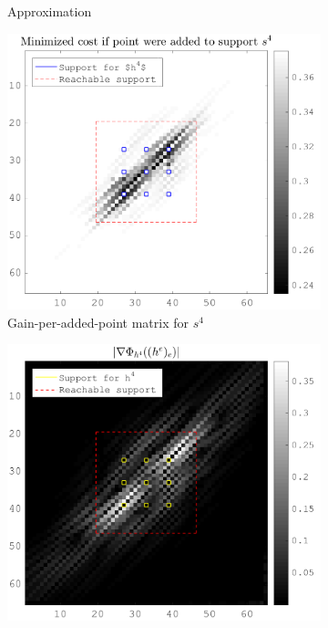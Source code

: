 \begin{figure}[!h]
\begin{subfigure}[b]{0.49\textwidth}
\caption{Approximation} \label{fig_gain_vs_grad_approx}
\end{subfigure}
\begin{subfigure}[b]{0.49\textwidth}\centering
\includegraphics[width=\textwidth]{figures/xp/xp_128x128_sc2_angl1_K3_S3_node4_objmatrix.png}
\caption{Gain-per-added-point matrix for $s^4$}
\end{subfigure}
\begin{subfigure}[b]{0.49\textwidth}\centering
\includegraphics[width=\textwidth]{figures/xp/xp_128x128_sc2_angl1_K3_S3_node4_partgrad4.png}

\end{subfigure}
\end{figure}
